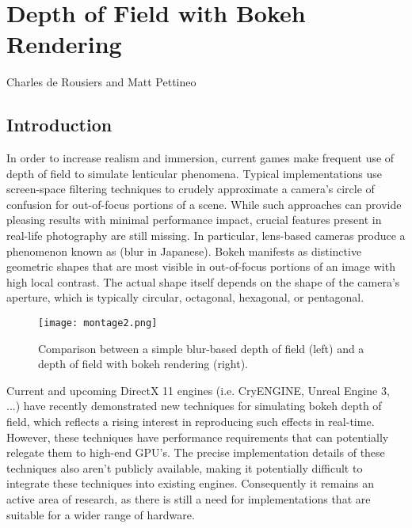 \chapter{Depth of Field with Bokeh Rendering}{Charles de Rousiers and Matt Pettineo}
\label{BokehRendering}

\section{Introduction}

In order to increase realism and immersion, current games make frequent use of depth of field to simulate lenticular phenomena. Typical implementations use screen-space filtering techniques to crudely approximate a camera's circle of confusion for out-of-focus portions of a scene. While such approaches can provide pleasing results with minimal performance impact, crucial features present in real-life photography are still missing. In particular, lens-based cameras produce a phenomenon known as \bokeh{} (blur in Japanese). Bokeh manifests as distinctive geometric shapes that are most visible in out-of-focus portions of an image with high local contrast. The actual shape itself depends on the shape of the camera’s aperture, which is typically circular, octagonal, hexagonal, or pentagonal.

	\begin{figure}[htb]\centering
	\texttt{[image: montage2.png]}
	\caption{Comparison between a simple blur-based depth of field (left) and a depth of field with bokeh rendering (right). }
	\label{Derousiers:blurcomparison}
	\end{figure}

Current and upcoming DirectX 11 engines (i.e. CryENGINE, Unreal Engine 3, ...) have recently demonstrated new techniques for simulating bokeh depth of field, which reflects a rising interest in reproducing such effects in real-time. However, these techniques have performance requirements that can potentially relegate them to high-end GPU's. The precise implementation details of these techniques also aren't publicly available, making it potentially difficult to integrate these techniques into existing engines. Consequently it remains an active area of research, as there is still a need for implementations that are suitable for a wider range of hardware.

